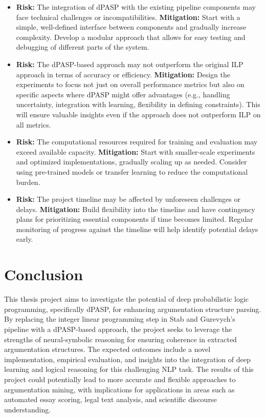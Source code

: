 \documentclass{article}
\begin{document}
\begin{itemize}
    \item \textbf{Risk:} The integration of dPASP with the existing pipeline
    components may face technical challenges or incompatibilities.
    \textbf{Mitigation:} Start with a simple, well-defined interface between
    components and gradually increase complexity. Develop a modular approach
    that allows for easy testing and debugging of different parts of the system.

    \item \textbf{Risk:} The dPASP-based approach may not outperform the
    original ILP approach in terms of accuracy or efficiency.
    \textbf{Mitigation:} Design the experiments to focus not just on overall
    performance metrics but also on specific aspects where dPASP might offer
    advantages (e.g., handling uncertainty, integration with learning,
    flexibility in defining constraints). This will ensure valuable insights
    even if the approach does not outperform ILP on all metrics.

    \item \textbf{Risk:} The computational resources required for training and
    evaluation may exceed available capacity.
    \textbf{Mitigation:} Start with smaller-scale experiments and optimized
    implementations, gradually scaling up as needed. Consider using pre-trained
    models or transfer learning to reduce the computational burden.

    \item \textbf{Risk:} The project timeline may be affected by unforeseen
    challenges or delays.
    \textbf{Mitigation:} Build flexibility into the timeline and have
    contingency plans for prioritizing essential components if time becomes
    limited. Regular monitoring of progress against the timeline will help
    identify potential delays early.
\end{itemize}

\section{Conclusion}

This thesis project aims to investigate the potential of deep probabilistic 
logic programming, specifically dPASP, for enhancing argumentation structure
parsing. By replacing the integer linear programming step in Stab and Gurevych's
pipeline with a dPASP-based approach, the project seeks to leverage the
strengths of neural-symbolic reasoning for ensuring coherence in extracted
argumentation structures. The expected outcomes include a novel implementation,
empirical evaluation, and insights into the integration of deep learning and
logical reasoning for this challenging NLP task. The results of this project
could potentially lead to more accurate and flexible approaches to argumentation
mining, with implications for applications in areas such as automated essay
scoring, legal text analysis, and scientific discourse understanding.



\end{document}
